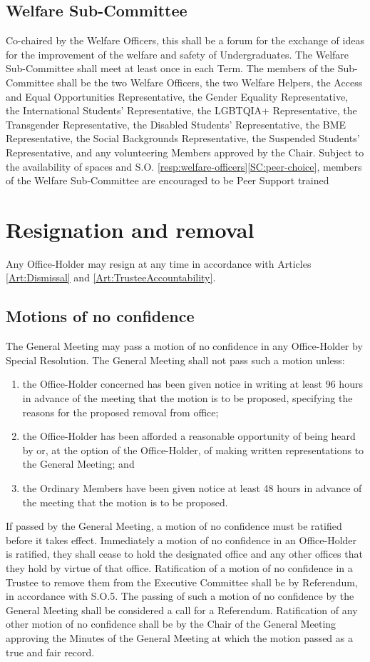 \subsection{Welfare Sub-Committee}
\npara Co-chaired by the Welfare Officers, this shall be a forum for the exchange of ideas for the improvement of the welfare and safety of Undergraduates.
\npara The Welfare Sub-Committee shall meet at least once in each Term.
\npara The members of the Sub-Committee shall be the two Welfare Officers, the two Welfare Helpers, the Access and Equal Opportunities Representative, the Gender Equality Representative, the International Students’ Representative, the LGBTQIA+ Representative, the Transgender Representative, the Disabled Students’ Representative, the BME Representative, the Social Backgrounds Representative, the Suspended Students' Representative, and any volunteering Members approved by the Chair.
\npara Subject to the availability of spaces and S.O. \ref{resp:welfare-officers}\ref{SC:peer-choice}, members of the Welfare Sub-Committee are encouraged to be Peer Support trained
\section{Resignation and removal}
\npara Any Office-Holder may resign at any time in accordance with Articles \ref{Art:Dismissal} and \ref{Art:TrusteeAccountability}.
\subsection{Motions of no confidence}
\npara The General Meeting may pass a motion of no confidence in any Office-Holder by Special Resolution.  The General Meeting shall not pass such a motion unless:
\begin{enumerate}
	\item the Office-Holder concerned has been given notice in writing at least 96 hours in advance of the meeting that the motion is to be proposed, specifying the reasons for the proposed removal from office;
	\item the Office-Holder has been afforded a reasonable opportunity of being heard by or, at the option of the Office-Holder, of making written representations to the General Meeting; and
	\item the Ordinary Members have been given notice at least 48 hours in advance of the meeting that the motion is to be proposed.
\end{enumerate}
\npara If passed by the General Meeting, a motion of no confidence must be ratified before it takes effect.  Immediately a motion of no confidence in an Office-Holder is ratified, they shall cease to hold the designated office and any other offices that they hold by virtue of that office.
\npara Ratification of a motion of no confidence in a Trustee to remove them from the Executive Committee shall be by Referendum, in accordance with S.O.5.  The passing of such a motion of no confidence by the General Meeting shall be considered a call for a Referendum.
\npara Ratification of any other motion of no confidence shall be by the Chair of the General Meeting approving the Minutes of the General Meeting at which the motion passed as a true and fair record.

